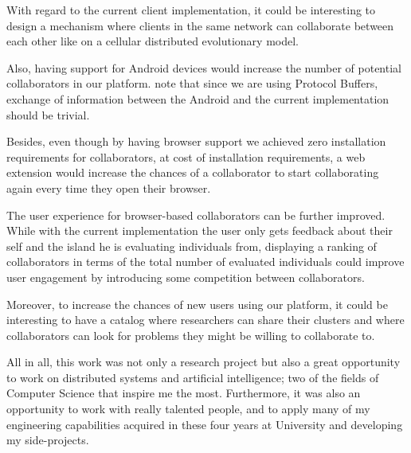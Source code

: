 With regard to the current client implementation, it could be interesting to design a mechanism where clients in the same network can collaborate between each other like on a cellular distributed evolutionary model. 

Also, having support for Android devices would increase the number of potential collaborators in our platform. note that since we are using Protocol Buffers, exchange of information between the Android and the current implementation should be trivial. 

Besides, even though by having browser support we achieved zero installation requirements for collaborators, at cost of installation requirements, a web extension would increase the chances of a collaborator to start collaborating again every time they open their browser.

The user experience for browser-based collaborators can be further improved. While with the current implementation the user only gets feedback about their self and the island he is evaluating individuals from, displaying a ranking of collaborators in terms of the total number of evaluated individuals could improve user engagement by introducing some competition between collaborators. 

Moreover, to increase the chances of new users using our platform, it could be interesting to have a catalog where researchers can share their clusters and where collaborators can look for problems they might be willing to collaborate to.

All in all, this work was not only a research project but also a great opportunity to work on distributed systems and artificial intelligence; two of the fields of Computer Science that inspire me the most. Furthermore, it was also an opportunity to work with really talented people, and to apply many of my engineering capabilities acquired in these four years at University and developing my side-projects.